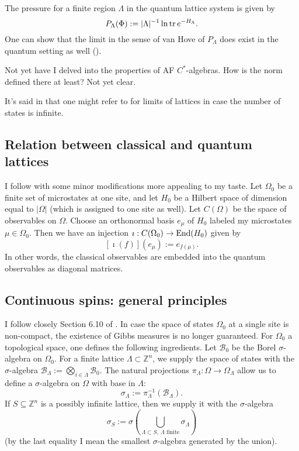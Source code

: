 The pressure for a finite region $\Lambda$ in the quantum lattice system is given by
\[
P_{\Lambda}(\Phi) := |\Lambda|^{-1} \ln \operatorname{tr} e^{-H_{\Lambda}}.
\]
One can show that the limit in the sense of van Hove of $P_{\Lambda}$ does exist in the quantum setting as well (\cite{israel}).

\begin{fur}
Not yet have I delved into the properties of AF $C^*$-algebras. How is the norm defined there at least? Not yet clear.
\end{fur}

\begin{fur}
It's said in \cite{bratteli} that one might refer to \cite{haag} for limits of lattices in case the number of states is infinite.
\end{fur}

\subsection{Relation between classical and quantum lattices}
I follow \cite{israel} with some minor modifications more appealing to my taste. Let $\Omega_0$ be a finite set of microstates at one site, and let $H_0$ be a Hilbert space of dimension equal to $|\Omega|$ (which is assigned to one site as well). Let $C(\Omega)$ be the space of observables on $\Omega$. Choose an orthonormal basis $e_{\mu}$ of $H_0$ labeled my microstates $\mu \in \Omega_0$. Then we have an injection $\imath : C(\Omega_0) \rightarrow \operatorname{End}(H_0)$ given by
\[
[\imath(f)](e_{\mu}) := e_{f(\mu)}.
\]
In other words, the classical observables are embedded into the quantum observables as diagonal matrices.

\subsection{Continuous spins: general principles}\label{ss:gen_princ}
I follow closely Section 6.10 of \cite{friedli}. In case the space of states $\Omega_0$ at a single site is non-compact, the existence of Gibbs measures is no longer guaranteed. For $\Omega_0$ a topological space, one defines the following ingredients. Let $\mathcal B_0$ be the Borel $\sigma$-algebra on $\Omega_0$. For a finite lattice $\Lambda \subset \mathbb Z^n$, we supply the space of states with the $\sigma$-algebra $\mathcal B_{\Lambda} := \bigotimes_{i \in \Lambda} \mathcal B_0$. The natural projections $\pi_{\Lambda} : \Omega \rightarrow \Omega_{\Lambda}$ allow us to define a $\sigma$-algebra on $\Omega$ with base in $\Lambda$:
\[
\sigma_{\Lambda} := \pi^{-1}_{\Lambda}(\mathcal B_{\Lambda}).
\]
If $S \subseteq \mathbb Z^n$ is a possibly infinite lattice, then we supply it with the $\sigma$-algebra
\[
\sigma_{S} := \sigma(\bigcup_{\Lambda \subset S, \ \Lambda \text{ finite}} \sigma_{\Lambda})
\]
(by the last equality I mean the smallest $\sigma$-algebra generated by the union).